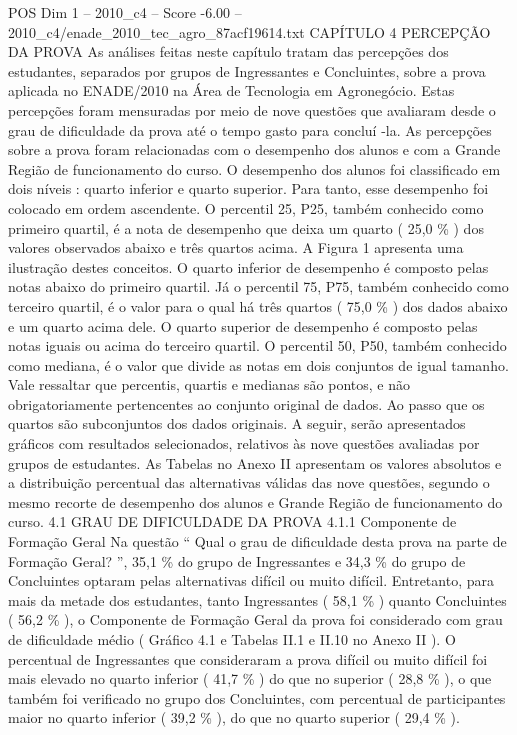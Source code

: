 \begin{textsample}{POS Dim 1 – 2010\_c4 – Score -6.00 – 2010\_c4/enade\_2010\_tec\_agro\_87acf19614.txt}  \label{ex:f1_pos_405}
CAPÍTULO 4 PERCEPÇÃO DA PROVA As análises feitas neste capítulo tratam das percepções dos estudantes, separados por grupos de Ingressantes e Concluintes, sobre a prova aplicada no ENADE/2010 na Área de Tecnologia em Agronegócio.
Estas percepções foram mensuradas por meio de nove questões que avaliaram desde o grau de dificuldade da prova até o tempo gasto para concluí -la.
As percepções sobre a prova foram relacionadas com o desempenho dos alunos e com a Grande Região de funcionamento do curso.
O desempenho dos alunos foi classificado em dois níveis : quarto inferior e quarto superior.
Para tanto, esse desempenho foi colocado em ordem ascendente.
O percentil 25, P25, também conhecido como primeiro quartil, é a nota de desempenho que deixa um quarto ( 25,0 \% ) dos valores observados abaixo e três quartos acima.
A Figura 1 apresenta uma ilustração destes conceitos.
O quarto inferior de desempenho é composto pelas notas abaixo do primeiro quartil.
Já o percentil 75, P75, também conhecido como terceiro quartil, é o valor para o qual há três quartos ( 75,0 \% ) dos dados abaixo e um quarto acima dele.
O quarto superior de desempenho é composto pelas notas iguais ou acima do terceiro quartil.
O percentil 50, P50, também conhecido como mediana, é o valor que divide as notas em dois conjuntos de igual tamanho.
Vale ressaltar que percentis, quartis e medianas são pontos, e não obrigatoriamente pertencentes ao conjunto original de dados.
Ao passo que os quartos são subconjuntos dos dados originais.
A seguir, serão apresentados gráficos com resultados selecionados, relativos às nove questões avaliadas por grupos de estudantes.
As Tabelas no Anexo II apresentam os valores absolutos e a distribuição percentual das alternativas válidas das nove questões, segundo o mesmo recorte de desempenho dos alunos e Grande Região de funcionamento do curso. 4.1 GRAU DE DIFICULDADE DA PROVA 4.1.1 Componente de Formação Geral Na questão “ Qual o grau de dificuldade desta prova na parte de Formação Geral? ”, 35,1 \% do grupo de Ingressantes e 34,3 \% do grupo de Concluintes optaram pelas alternativas difícil ou muito difícil.
Entretanto, para mais da metade dos estudantes, tanto Ingressantes ( 58,1 \% ) quanto Concluintes ( 56,2 \% ), o Componente de Formação Geral da prova foi considerado com grau de dificuldade médio ( Gráfico 4.1 e Tabelas II.1 e II.10 no Anexo II ).
O percentual de Ingressantes que consideraram a prova difícil ou muito difícil foi mais elevado no quarto inferior ( 41,7 \% ) do que no superior ( 28,8 \% ), o que também foi verificado no grupo dos Concluintes, com percentual de participantes maior no quarto inferior ( 39,2 \% ), do que no quarto superior ( 29,4 \% ).

\end{textsample}
